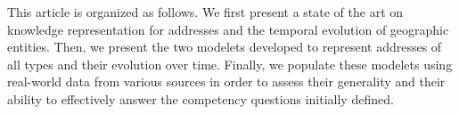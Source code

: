 This article is organized as follows.
We first present a state of the art on knowledge representation for addresses and the temporal evolution of geographic entities.
Then, we present the two modelets developed to represent addresses of all types and their evolution over time.
Finally, we populate these modelets using real-world data from various sources in order to assess their generality and their ability to effectively answer the competency questions initially defined.